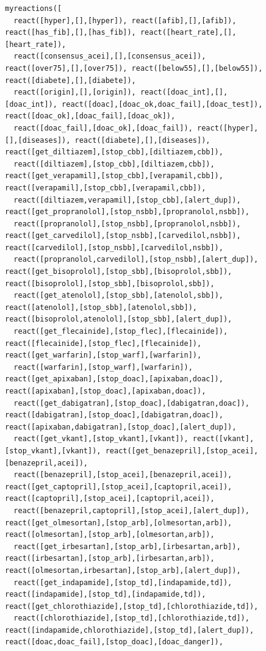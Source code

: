 \begin{figure}[t]
\begin{verbatim}
myreactions([
  react([hyper],[],[hyper]), react([afib],[],[afib]), react([has_fib],[],[has_fib]), react([heart_rate],[],[heart_rate]),
  react([consensus_acei],[],[consensus_acei]), react([over75],[],[over75]), react([below55],[],[below55]), react([diabete],[],[diabete]),
  react([origin],[],[origin]), react([doac_int],[],[doac_int]), react([doac],[doac_ok,doac_fail],[doac_test]), react([doac_ok],[doac_fail],[doac_ok]),
  react([doac_fail],[doac_ok],[doac_fail]), react([hyper],[],[diseases]), react([diabete],[],[diseases]), react([get_diltiazem],[stop_cbb],[diltiazem,cbb]),
  react([diltiazem],[stop_cbb],[diltiazem,cbb]), react([get_verapamil],[stop_cbb],[verapamil,cbb]), react([verapamil],[stop_cbb],[verapamil,cbb]),
  react([diltiazem,verapamil],[stop_cbb],[alert_dup]), react([get_propranolol],[stop_nsbb],[propranolol,nsbb]),
  react([propranolol],[stop_nsbb],[propranolol,nsbb]), react([get_carvedilol],[stop_nsbb],[carvedilol,nsbb]), react([carvedilol],[stop_nsbb],[carvedilol,nsbb]), 
  react([propranolol,carvedilol],[stop_nsbb],[alert_dup]), react([get_bisoprolol],[stop_sbb],[bisoprolol,sbb]), react([bisoprolol],[stop_sbb],[bisoprolol,sbb]),
  react([get_atenolol],[stop_sbb],[atenolol,sbb]), react([atenolol],[stop_sbb],[atenolol,sbb]), react([bisoprolol,atenolol],[stop_sbb],[alert_dup]),
  react([get_flecainide],[stop_flec],[flecainide]), react([flecainide],[stop_flec],[flecainide]), react([get_warfarin],[stop_warf],[warfarin]),
  react([warfarin],[stop_warf],[warfarin]), react([get_apixaban],[stop_doac],[apixaban,doac]), react([apixaban],[stop_doac],[apixaban,doac]),
  react([get_dabigatran],[stop_doac],[dabigatran,doac]), react([dabigatran],[stop_doac],[dabigatran,doac]), react([apixaban,dabigatran],[stop_doac],[alert_dup]),
  react([get_vkant],[stop_vkant],[vkant]), react([vkant],[stop_vkant],[vkant]), react([get_benazepril],[stop_acei],[benazepril,acei]), 
  react([benazepril],[stop_acei],[benazepril,acei]), react([get_captopril],[stop_acei],[captopril,acei]), react([captopril],[stop_acei],[captopril,acei]),
  react([benazepril,captopril],[stop_acei],[alert_dup]), react([get_olmesortan],[stop_arb],[olmesortan,arb]), react([olmesortan],[stop_arb],[olmesortan,arb]), 
  react([get_irbesartan],[stop_arb],[irbesartan,arb]), react([irbesartan],[stop_arb],[irbesartan,arb]), react([olmesortan,irbesartan],[stop_arb],[alert_dup]),
  react([get_indapamide],[stop_td],[indapamide,td]), react([indapamide],[stop_td],[indapamide,td]), react([get_chlorothiazide],[stop_td],[chlorothiazide,td]), 
  react([chlorothiazide],[stop_td],[chlorothiazide,td]), react([indapamide,chlorothiazide],[stop_td],[alert_dup]), react([doac,doac_fail],[stop_doac],[doac_danger]),

\end{verbatim}
\end{figure}
